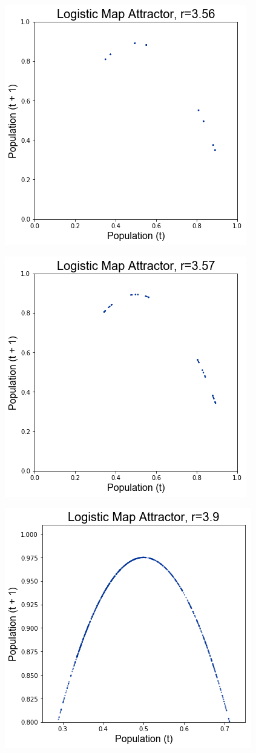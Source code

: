 \documentclass[a4paper,12pt]{article}
\begin{document}
\begin{center}
\includegraphics[scale=0.5]{7.png}
\end{center}
\begin{center}
\includegraphics[scale=0.5]{8.png}
\end{center}
\begin{center}
\includegraphics[scale=0.5]{9.png}
\end{center}
\end{document}

